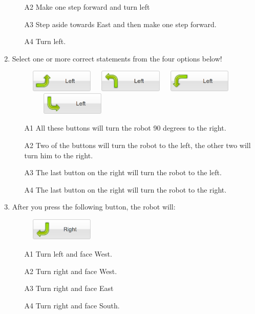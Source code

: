 \begin{enumerate}
\begin{enumerate}
\item[A2] Make one step forward and turn left
\item[A3] Step aside towards East and then make one step forward.
\item[A4] Turn left.
\end{enumerate}
\item Select one or more correct statements from the four options below!
\begin{figure}[!ht]
\begin{center}
\includegraphics[width=3cm]{imgk/button-left-1.png}\ \ \
\includegraphics[width=3cm]{imgk/button-left-2.png}\ \ \
\includegraphics[width=3cm]{imgk/button-left-3.png}\ \ \
\includegraphics[width=3cm]{imgk/button-left-4.png}
\end{center}
\end{figure}

\begin{enumerate}
\item[A1] All these buttons will turn the robot 90 degrees to the right.
\item[A2] Two of the buttons will turn the robot to the left, the other 
          two will turn him to the right.
\item[A3] The last button on the right will turn the robot to the left.
\item[A4] The last button on the right will turn the robot to the right.
\end{enumerate}
\item After you press the following button, the robot will:

\begin{figure}[!ht]
\begin{center}
\includegraphics[width=3cm]{imgk/button-right-4.png}
\end{center}
\end{figure}
\begin{enumerate}
\item[A1] Turn left and face West.
\item[A2] Turn right and face West.
\item[A3] Turn right and face East
\item[A4] Turn right and face South.
\end{enumerate}
\end{enumerate}

